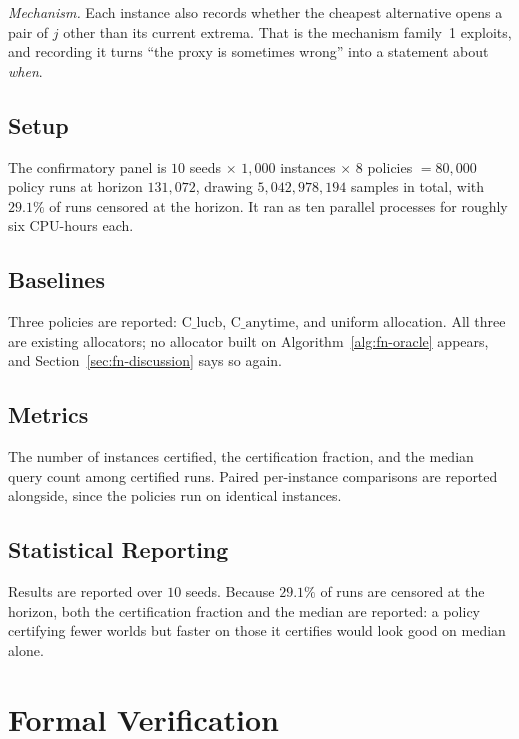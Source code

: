 \documentclass[conference]{IEEEtran}
\theoremstyle{definition}
\begin{document}
\emph{Mechanism.} Each instance also records whether the cheapest alternative opens a pair of
$j$ other than its current extrema. That is the mechanism family~1 exploits, and recording it
turns ``the proxy is sometimes wrong'' into a statement about \emph{when}.

\subsection{Setup}

The confirmatory panel is $10$ seeds $\times$ $1{,}000$ instances $\times$ $8$ policies
$=80{,}000$ policy runs at horizon $131{,}072$, drawing $5{,}042{,}978{,}194$ samples in
total, with $29.1\%$ of runs censored at the horizon. It ran as ten parallel processes for
roughly six CPU-hours each.

\subsection{Baselines}

Three policies are reported: $\mathrm{C\_lucb}$, $\mathrm{C\_anytime}$, and uniform
allocation. All three are existing allocators; no allocator built on
Algorithm~\ref{alg:fn-oracle} appears, and Section~\ref{sec:fn-discussion} says so again.

\subsection{Metrics}

The number of instances certified, the certification fraction, and the median query count
among certified runs. Paired per-instance comparisons are reported alongside, since the
policies run on identical instances.

\subsection{Statistical Reporting}

Results are reported over $10$ seeds. Because $29.1\%$ of runs are censored at the horizon,
both the certification fraction and the median are reported: a policy certifying fewer worlds
but faster on those it certifies would look good on median alone.


\section{Formal Verification}
\end{document}
